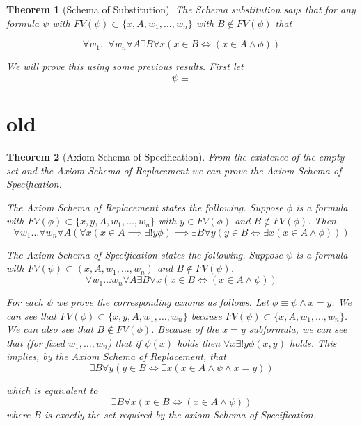 \documentclass[12pt]{article}
\theoremstyle{break}
\theoremstyle{break}
\newtheorem{theorem}{Theorem}[section]
\theoremstyle{break}
\theoremstyle{break}
\theoremstyle{break}
\newtheorem{informal definition}[definition]{Informal Definition}
\begin{document}
\begin{theorem}[Schema of Substitution]
The Schema substitution says that for any formula $\psi$ with $FV(\psi) \subset \{x, A, w_1, \ldots, w_n\}$ with $B\not \in FV(\psi)$ that

$$
\forall w_1\ldots \forall w_n \forall A \exists B \forall x (x \in B \iff (x\in A \land \phi))
$$

We will prove this using some previous results.
First let
$$
\psi \equiv
$$



\end{theorem}



\section{old}


\begin{theorem}[Axiom Schema of Specification]
From the existence of the empty set and the Axiom Schema of Replacement we can prove the Axiom Schema of Specification.

The Axiom Schema of Replacement states the following.
Suppose $\phi$ is a formula with $FV(\phi) \subset \{x, y, A, w_1, \ldots, w_n\}$ with $y\in FV(\phi)$ and $B\not \in FV(\phi)$.
Then
$$
\forall w_1\ldots \forall w_n \forall A\left(\forall x (x\in  A \implies \exists! y\phi) \implies \exists B \forall y(y\in B \iff \exists x(x\in A \land \phi))\right)
$$

The Axiom Schema of Specification states the following.
Suppose $\psi$ is a formula with $FV(\psi) \subset (x, A, w_1, \ldots, w_n)$ and $B\not \in FV(\psi)$.
$$
\forall w_1\ldots w_n \forall A \exists B \forall x ( x\in B \iff (x\in A \land \psi))
$$

For each $\psi$ we prove the corresponding axioms as follows.
Let $\phi \equiv \psi \land x=y$.
We can see that $FV(\phi) \subset \{x, y, A, w_1, \ldots, w_n\}$ because $FV(\psi) \subset \{x, A, w_1, \ldots, w_n\}$.
We can also see that $B\not \in FV(\phi)$.
Because of the $x=y$ subformula, we can see that (for fixed $w_1,\ldots, w_n$) that if $\psi(x)$ holds then $\forall x\exists! y \phi(x, y)$ holds.
This implies, by the Axiom Schema of Replacement, that
$$
\exists B \forall y(y\in B \iff \exists x (x \in A \land \psi \land x=y))
$$

which is equivalent to
$$
\exists B \forall x (x\in B \iff (x\in A \land \psi))
$$
where $B$ is exactly the set required by the axiom Schema of Specification.
\end{theorem}
\end{document}
